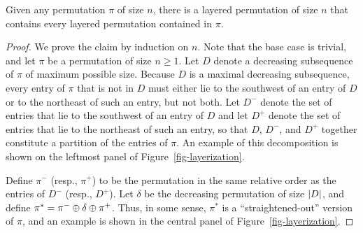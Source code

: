 \begin{proposition}
\label{prop-layerize}
	Given any permutation $\pi$ of size $n$, there is a layered permutation of size $n$ that contains every layered permutation contained in $\pi$.
\end{proposition}
\begin{proof}
	We prove the claim by induction on $n$. Note that the base case is trivial, and let $\pi$ be a permutation of size $n \ge 1$. Let $D$ denote a decreasing subsequence of $\pi$ of maximum possible size. Because $D$ is a maximal decreasing subsequence, every entry of $\pi$ that is not in $D$ must either lie to the southwest of an entry of $D$ or to the northeast of such an entry, but not both. Let $D^-$ denote the set of entries that lie to the southwest of an entry of $D$ and let $D^+$ denote the set of entries that lie to the northeast of such an entry, so that $D$, $D^-$, and $D^+$ together constitute a partition of the entries of $\pi$. An example of this decomposition is shown on the leftmost panel of Figure~\ref{fig-layerization}.

	Define $\pi^-$ (resp., $\pi^+$) to be the permutation in the same relative order as the entries of $D^-$ (resp., $D^+$). Let $\delta$ be the decreasing permutation of size $\left\lvert{D}\right\rvert$, and define $\pi^\ast = \pi^-\oplus\delta\oplus\pi^+$. Thus, in some sense, $\pi^\ast$ is a ``straightened-out'' version of $\pi$, and an example is shown in the central panel of Figure~\ref{fig-layerization}.


\end{proof}
